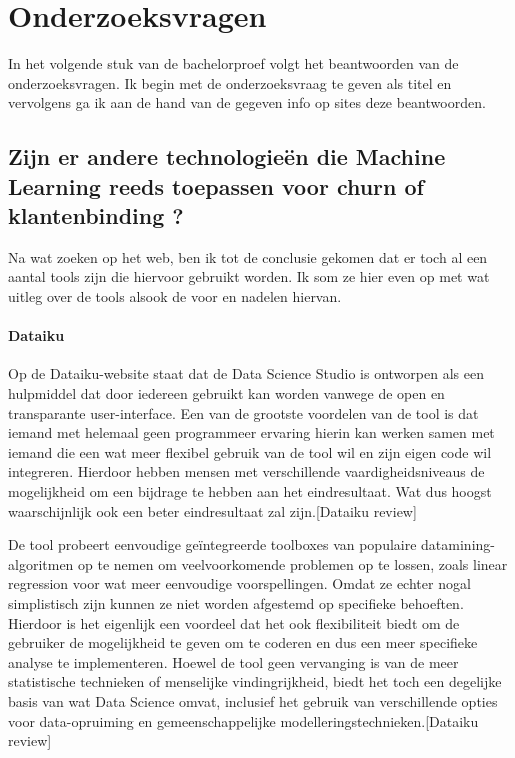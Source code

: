 
\chapter{Onderzoeksvragen}
\label{ch:Onderzoeksvragen}
In het volgende stuk van de bachelorproef volgt het beantwoorden van de onderzoeksvragen. Ik begin met de onderzoeksvraag te geven als titel en vervolgens ga ik aan de hand van de gegeven info op sites deze beantwoorden. 

\section{Zijn er andere technologieën die Machine Learning reeds toepassen voor churn of klantenbinding ?}
\label{ch:Onderzoeksvraag1}
Na wat zoeken op het web, ben ik tot de conclusie gekomen dat er toch al een aantal tools zijn die hiervoor gebruikt worden. Ik som ze hier even op met wat uitleg over de tools alsook de voor en nadelen hiervan. 

\subsubsection{Dataiku}
Op de Dataiku-website staat dat  de Data Science Studio is ontworpen als een hulpmiddel dat door iedereen gebruikt kan worden vanwege de open en transparante user-interface. Een van de grootste voordelen van de tool is dat iemand met helemaal geen programmeer ervaring hierin kan werken samen met iemand die een wat meer flexibel gebruik van de tool wil en zijn eigen code wil integreren. Hierdoor hebben mensen met verschillende vaardigheidsniveaus de mogelijkheid om een bijdrage te hebben aan het eindresultaat. Wat dus hoogst waarschijnlijk ook een beter eindresultaat zal zijn.[Dataiku review]

De tool probeert eenvoudige geïntegreerde toolboxes van populaire datamining-algoritmen op te nemen om veelvoorkomende problemen op te lossen, zoals linear regression voor wat meer eenvoudige voorspellingen. Omdat ze echter nogal simplistisch zijn kunnen ze niet worden afgestemd op specifieke behoeften. Hierdoor is het eigenlijk een voordeel dat het ook flexibiliteit biedt om de  gebruiker de mogelijkheid te geven om te coderen en dus een meer specifieke analyse te implementeren. Hoewel de tool geen vervanging is van de meer statistische technieken of menselijke vindingrijkheid, biedt het toch een degelijke basis van wat Data Science omvat, inclusief het gebruik van verschillende opties voor data-opruiming en gemeenschappelijke modelleringstechnieken.[Dataiku review]

